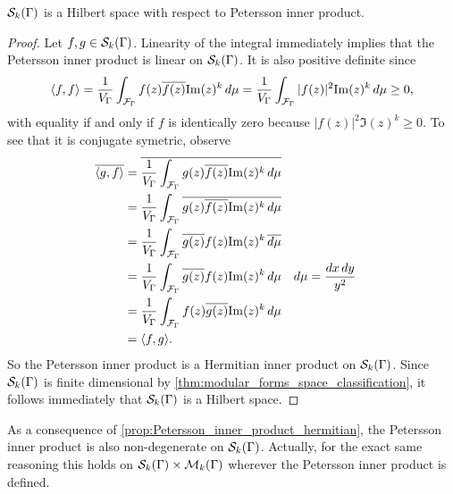       \begin{proposition}\label{prop:Petersson_inner_product_hermitian}
        $\mathcal{S}_{k}(\Gamma)$ is a Hilbert space with respect to Petersson inner product.
      \end{proposition}
      \begin{proof}
        Let $f,g \in \mathcal{S}_{k}(\Gamma)$. Linearity of the integral immediately implies that the Petersson inner product is linear on $\mathcal{S}_{k}(\Gamma)$. It is also positive definite since
        \[
          \langle f,f\rangle = \frac{1}{V_{\Gamma}}\int_{\mathcal{F}_{\Gamma}}f(z)\overline{f(z)}\mathrm{Im}(z)^{k}\,d\mu = \frac{1}{V_{\Gamma}}\int_{\mathcal{F}_{\Gamma}}|f(z)|^{2}\mathrm{Im}(z)^{k}\,d\mu \ge 0,
        \]
        with equality if and only if $f$ is identically zero because $|f(z)|^{2}\Im(z)^{k} \ge 0$. To see that it is conjugate symetric, observe
        \begin{align*}
          \overline{\langle g,f\rangle} &= \overline{\frac{1}{V_{\Gamma}}\int_{\mathcal{F}_{\Gamma}}g(z)\overline{f(z)}\mathrm{Im}(z)^{k}\,d\mu} \\
          &= \frac{1}{V_{\Gamma}}\int_{\mathcal{F}_{\Gamma}}\overline{g(z)\overline{f(z)}\mathrm{Im}(z)^{k}\,d\mu} \\
          &= \frac{1}{V_{\Gamma}}\int_{\mathcal{F}_{\Gamma}}\overline{g(z)}f(z)\mathrm{Im}(z)^{k}\,\overline{d\mu} \\
          &= \frac{1}{V_{\Gamma}}\int_{\mathcal{F}_{\Gamma}}\overline{g(z)}f(z)\mathrm{Im}(z)^{k}\,d\mu && \text{$d\mu = \frac{dx\,dy}{y^{2}}$} \\
          &= \frac{1}{V_{\Gamma}}\int_{\mathcal{F}_{\Gamma}}f(z)\overline{g(z)}\mathrm{Im}(z)^{k}\,d\mu \\
          &= \langle f,g\rangle.
        \end{align*}
        So the Petersson inner product is a Hermitian inner product on $\mathcal{S}_{k}(\Gamma)$. Since $\mathcal{S}_{k}(\Gamma)$ is finite dimensional by \cref{thm:modular_forms_space_classification}, it follows immediately that $\mathcal{S}_{k}(\Gamma)$ is a Hilbert space.
      \end{proof}

      \begin{remark}\label{rem:non-degeneracy_of_Petersson_inner_product}
        As a consequence of \cref{prop:Petersson_inner_product_hermitian}, the Petersson inner product is also non-degenerate on $\mathcal{S}_{k}(\Gamma)$. Actually, for the exact same reasoning this holds on $\mathcal{S}_{k}(\Gamma) \times \mathcal{M}_{k}(\Gamma)$ wherever the Petersson inner product is defined.
      \end{remark}

